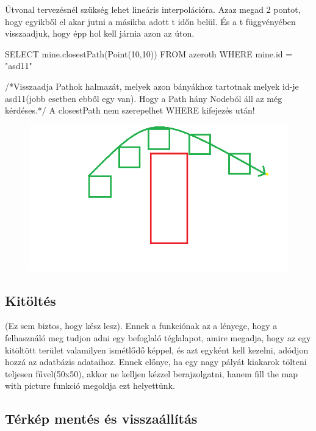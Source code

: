 \begin{sql}
Útvonal tervezésnél szükség lehet lineáris interpolációra. Azaz megad 2 pontot, hogy egyikből el akar jutni a másikba adott t időn belül. És a t függvényében visszaadjuk, hogy épp hol kell járnia azon az úton.

\begin{sql}
SELECT mine.closestPath(Point(10,10)) FROM azeroth WHERE mine.id = "asd11"
\end{sql}
/*Visszaadja Pathok halmazát, melyek azon bányákhoz tartotnak melyek id-je asd11(jobb esetben ebből egy van). Hogy a Path hány Nodeból áll az még kérdéses.*/
A closestPath nem szerepelhet WHERE kifejezés után!

\begin{figure}[htb]
\begin{center}
    \includegraphics[scale=0.5]{images/path}
    \caption{}
    \label{fig:path}
\end{center}
\end{figure}

\subsection{Kitöltés}

(Ez sem biztos, hogy kész lesz).  Ennek a funkciónak az a lényege, hogy a felhasználó meg tudjon adni egy befoglaló téglalapot, amire megadja, hogy az egy kitöltött terület valamilyen ismétlődő képpel, és azt egyként kell kezelni, adódjon hozzá az adatbázis adataihoz. Ennek előnye, ha egy nagy pályát kiakarok tölteni teljesen fűvel(50x50), akkor ne kelljen kézzel berajzolgatni, hanem fill the map with picture funkció megoldja ezt helyettünk.

\subsection{Térkép mentés és visszaállítás}


\end{sql}
